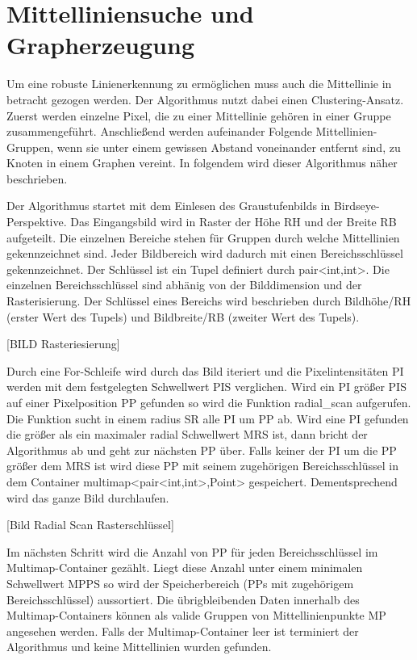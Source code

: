%

\chapter{Mittelliniensuche und Grapherzeugung}
\label{cha:Mittelliniensuche und Grapherzeugung} 
%
%
Um eine robuste Linienerkennung zu erm{\"o}glichen muss auch die Mittellinie in betracht gezogen werden. Der Algorithmus nutzt dabei einen Clustering-Ansatz. Zuerst werden einzelne Pixel, die zu einer Mittellinie geh{\"o}ren in einer Gruppe zusammengef{\"u}hrt. Anschlie{\ss}end werden aufeinander Folgende Mittellinien-Gruppen, wenn sie unter einem gewissen Abstand voneinander entfernt sind, zu Knoten in einem Graphen vereint. In folgendem wird dieser Algorithmus n{\"a}her beschrieben.

Der Algorithmus startet mit dem Einlesen des Graustufenbilds in Birdseye-Perspektive.
Das Eingangsbild wird in Raster der H{\"o}he RH und der Breite RB aufgeteilt. Die einzelnen Bereiche stehen f{\"u}r Gruppen durch welche Mittellinien gekennzeichnet sind. Jeder Bildbereich wird dadurch mit einen Bereichsschl{\"u}ssel gekennzeichnet. Der Schl{\"u}ssel ist ein Tupel definiert durch pair<int,int>. Die einzelnen Bereichsschl{\"u}ssel sind abh{\"a}nig von der Bilddimension und der Rasterisierung.
Der Schl{\"u}ssel eines Bereichs wird beschrieben durch Bildh{\"o}he/RH (erster Wert des Tupels) und Bildbreite/RB (zweiter Wert des Tupels).

[BILD Rasteriesierung]     

Durch eine For-Schleife wird durch das Bild iteriert und die Pixelintensit{\"a}ten PI werden mit dem festgelegten Schwellwert PIS verglichen. Wird ein PI gr{\"o}{\ss}er PIS auf einer Pixelposition PP gefunden so wird die Funktion radial\_scan aufgerufen. Die Funktion sucht in einem radius SR alle PI um PP ab. Wird eine PI gefunden die gr{\"o}{\ss}er als ein maximaler radial Schwellwert MRS ist, dann bricht der Algorithmus ab und geht zur n{\"a}chsten PP {\"u}ber. Falls keiner der PI um die PP gr{\"o}{\ss}er dem MRS ist wird diese PP mit seinem zugeh{\"o}rigen Bereichsschl{\"u}ssel in dem Container multimap<pair<int,int>,Point> gespeichert. Dementsprechend wird das ganze Bild durchlaufen.

[Bild Radial Scan Rasterschl{\"u}ssel]

Im n{\"a}chsten Schritt wird die Anzahl von PP f{\"u}r jeden Bereichsschl{\"u}ssel im Multimap-Container gez{\"a}hlt. Liegt diese Anzahl unter einem minimalen Schwellwert MPPS so wird der Speicherbereich (PPs mit zugeh{\"o}rigem Bereichsschl{\"u}ssel) aussortiert. Die {\"u}brigbleibenden Daten innerhalb des Multimap-Containers k{\"o}nnen als valide Gruppen von Mittellinienpunkte MP angesehen werden. Falls der Multimap-Container leer ist terminiert der Algorithmus und keine Mittellinien wurden gefunden.

